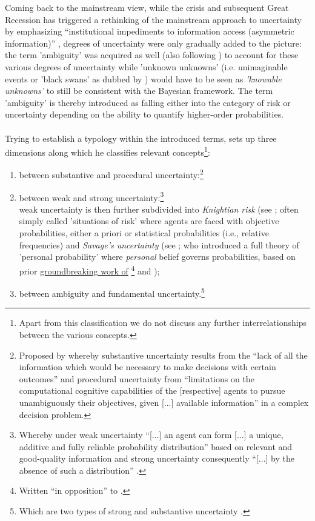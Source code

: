 \documentclass[a4paper,11pt,listof=nochaptergap,oneside,pointednumbers,bibtotoc,bigheadings,liststotoc,hidelinks]{scrbook}
\theoremstyle{mysatz}
\theoremstyle{mydefinition}
\theoremstyle{mytheorem}
\theoremstyle{mybemerkung}
\begin{document}
Coming back to the mainstream view, while the crisis and subsequent Great Recession has triggered a rethinking of the mainstream approach to uncertainty by emphasizing ``institutional impediments to information access (asymmetric information)'' \citep[p. 8]{dow:16}, degrees of uncertainty were only gradually added to the picture: the term 'ambiguity' was acquired as well (also following \citealp[p. 330]{camererandweber:92}) to account for these various degrees of uncertainty while 'unknown unknowns' (i.e. unimaginable events or 'black swans' as dubbed by \citealp{taleb:08}) would have to be seen as \textit{'knowable unknowns'} to still be consistent with the Bayesian framework. The term 'ambiguity' is thereby introduced as falling either into the category of risk or uncertainty depending on the ability to quantify higher-order probabilities.\\
\\
Trying to establish a typology within the introduced terms, \citet{dequech:14}  sets up three dimensions along which he classifies relevant concepts\footnote{Apart from this classification we do not discuss any further interrelationships between the various concepts.}: 
\begin{enumerate}
	\item between substantive and procedural uncertainty:\footnote{Proposed by \citet[p. 145]{dosiandegidi:91} whereby substantive uncertainty results from the ``lack of all the information which would be necessary to make decisions with certain outcomes'' and procedural uncertainty from ``limitations on the computational cognitive capabilities of the [respective] agents to pursue unambiguously their objectives, given [...] available information'' in a complex decision problem. }
	\item between weak and strong uncertainty:\footnote{Whereby under weak uncertainty ``[...] an agent can form [...] a unique, additive and fully reliable probability distribution'' based on relevant and good-quality information and strong uncertainty consequently ``[...] by the absence of such a distribution'' \citep[p. 622/623]{dequech:14}.} \\
	weak uncertainty is then further subdivided into \textit{Knightian risk} (see \citet{knight:21}; often simply called 'situations of risk' where agents are faced with objective probabilities, either a priori or statistical probabilities (i.e., relative frequencies) and \textit{Savage's uncertainty} (see \citet{savage:54}; who introduced a full theory of 'personal probability' where \textit{personal} belief governs probabilities, based on prior \href{https://archive.org/stream/in.ernet.dli.2015.223806/2015.223806.The-Foundations#page/n289/mode/2up}{groundbreaking work of} \href{http://www.brunodefinetti.it/Link/Subjective%20Expected%20Utility%20-%20Intro.htm}{\citet{ramsey:26}\footnote{Written ``in opposition'' to \citet{keynes:21}.} and \citet{finetti:37}});
	\item between ambiguity and fundamental uncertainty.\footnote{Which are two types of strong and substantive uncertainty \citep{dequesh:00}.}
\end{enumerate}
\vspace{1cm}
\end{document}
